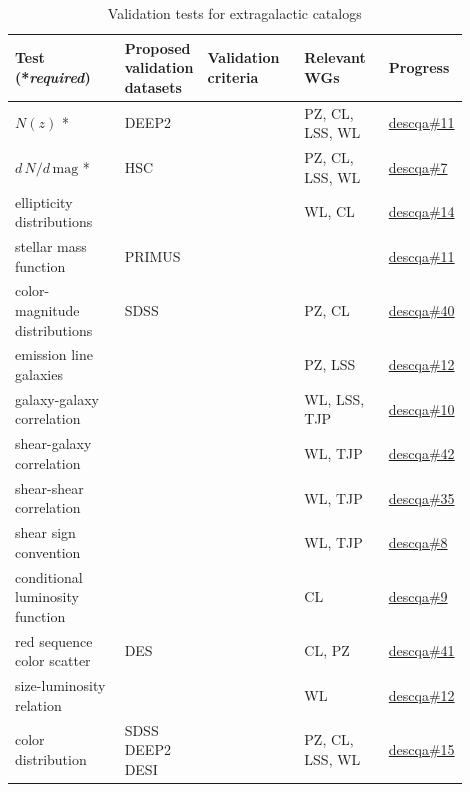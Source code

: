 \documentclass[preprint,times]{aastex61}
\newcommand*{\Issue}[2]{\href{https://github.com/LSSTDESC/#1/issues/#2}{#1\##2}}
\begin{document}
\begin{table}[!htb]
  \centering
  \caption{Validation tests for extragalactic catalogs}
  \label{tab:validation-tests}
  \begin{tabular}{|L{0.27\linewidth}|L{0.1\linewidth}|L{0.23\linewidth} |L{0.2\linewidth}|L{0.1\linewidth}|}
  \hline 
    Test (*\textit{required})         & Proposed validation datasets &  Validation criteria & Relevant WGs  & Progress \\
    \hline\hline
 $N(z)$ *                        & DEEP2 &   & PZ, CL, LSS, WL           & \Issue{descqa}{11} \\
 $d\,N/d\,\text{mag}$ *          & HSC  &   & PZ, CL, LSS, WL           & \Issue{descqa}{7}  \\
 ellipticity distributions       &     &    & WL, CL           & \Issue{descqa}{14} \\
 stellar mass function           & PRIMUS  &  &              & \Issue{descqa}{11} \\
 color-magnitude distributions   & SDSS &   & PZ, CL           & \Issue{descqa}{40} \\
 emission line galaxies          &     &    & PZ, LSS          & \Issue{descqa}{12} \\
 galaxy-galaxy correlation       &      &   & WL, LSS, TJP & \Issue{descqa}{10} \\
 shear-galaxy correlation        &      &   & WL, TJP      & \Issue{descqa}{42} \\
 shear-shear correlation         &     &    & WL, TJP      & \Issue{descqa}{35} \\
 shear sign convention           &     &    & WL, TJP      & \Issue{descqa}{8}  \\
 conditional luminosity function &    &     & CL           & \Issue{descqa}{9}  \\
 red sequence color scatter      & DES  &   & CL, PZ           & \Issue{descqa}{41} \\
 size-luminosity relation        &    &     & WL             & \Issue{descqa}{12} \\
 color distribution              & SDSS DEEP2 DESI &  & PZ, CL, LSS, WL & \Issue{descqa}{15} \\
   \hline
  \end{tabular}
\end{table}
\end{document}
